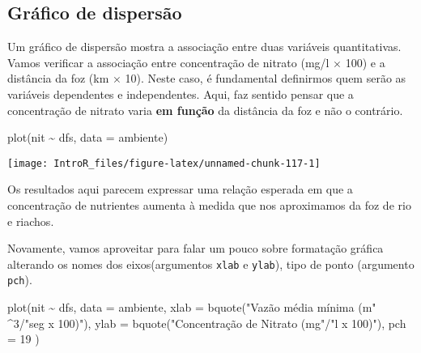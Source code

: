 \documentclass[
]{book}
\newenvironment{Shaded}{\begin{snugshade}}{\end{snugshade}}
\newcommand{\AttributeTok}[1]{\textcolor[rgb]{0.77,0.63,0.00}{#1}}
\newcommand{\DecValTok}[1]{\textcolor[rgb]{0.00,0.00,0.81}{#1}}
\newcommand{\FunctionTok}[1]{\textcolor[rgb]{0.00,0.00,0.00}{#1}}
\newcommand{\NormalTok}[1]{#1}
\newcommand{\SpecialCharTok}[1]{\textcolor[rgb]{0.00,0.00,0.00}{#1}}
\newcommand{\StringTok}[1]{\textcolor[rgb]{0.31,0.60,0.02}{#1}}
\begin{document}
\hypertarget{gruxe1fico-de-dispersuxe3o}{%
\subsection{Gráfico de dispersão}\label{gruxe1fico-de-dispersuxe3o}}

Um gráfico de dispersão mostra a associação entre duas variáveis quantitativas. Vamos verificar a associação entre concentração de nitrato (mg/l \(\times\) 100) e a distância da foz (km \(\times\) 10). Neste caso, é fundamental definirmos quem serão as variáveis dependentes e independentes. Aqui, faz sentido pensar que a concentração de nitrato varia \textbf{em função} da distância da foz e não o contrário.

\begin{Shaded}
\begin{Highlighting}[]
\FunctionTok{plot}\NormalTok{(nit }\SpecialCharTok{\textasciitilde{}}\NormalTok{ dfs, }\AttributeTok{data =}\NormalTok{ ambiente)}
\end{Highlighting}
\end{Shaded}

\begin{center}\texttt{[image: IntroR\_files/figure-latex/unnamed-chunk-117-1]} \end{center}

Os resultados aqui parecem expressar uma relação esperada em que a concentração de nutrientes aumenta à medida que nos aproximamos da foz de rio e riachos.

Novamente, vamos aproveitar para falar um pouco sobre formatação gráfica alterando os nomes dos eixos(argumentos \texttt{xlab} e \texttt{ylab}), tipo de ponto (argumento \texttt{pch}).

\begin{Shaded}
\begin{Highlighting}[]
\FunctionTok{plot}\NormalTok{(nit }\SpecialCharTok{\textasciitilde{}}\NormalTok{ dfs, }\AttributeTok{data =}\NormalTok{ ambiente,}
     \AttributeTok{xlab =} \FunctionTok{bquote}\NormalTok{(}\StringTok{"Vazão média mínima (m"} \SpecialCharTok{\^{}}\DecValTok{3}\SpecialCharTok{/}\StringTok{"seg x 100)"}\NormalTok{),}
     \AttributeTok{ylab =} \FunctionTok{bquote}\NormalTok{(}\StringTok{"Concentração de Nitrato (mg"}\SpecialCharTok{/}\StringTok{"l x 100)"}\NormalTok{),}
     \AttributeTok{pch =} \DecValTok{19}
\NormalTok{)}
\end{Highlighting}
\end{Shaded}
\end{document}
